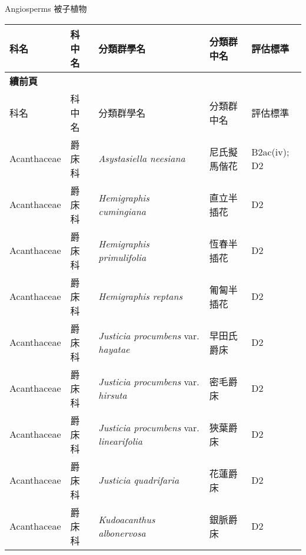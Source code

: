 \noindent\normalfont\selectfont Angiosperms 被子植物
\footnotesize\selectfont
        {\def\arraystretch{1.5}\tabcolsep=2pt
        \begin{longtable}{p{2.5cm}p{2.5cm}p{4.5cm}p{2.5cm}p{3cm}}
        \toprule
          科名 & 科中名 & 分類群學名 & 分類群中名 & 評估標準 \\
        \midrule 
        \endfirsthead

        {{\bfseries 續前頁 }} \\
        科名 & 科中名 & 分類群學名 & 分類群中名 & 評估標準 \\
        \midrule
        \endhead
                Acanthaceae & 爵床科 & \textit{Asystasiella neesiana}  & 尼氏擬馬偕花 & B2ac(iv); D2 \index{Asystasiella@\textit{Asystasiella}!neesiana@\textit{neesiana}}  \index{尼氏擬馬偕花} \\
    Acanthaceae & 爵床科 & \textit{Hemigraphis cumingiana}  & 直立半插花 & D2 \index{Hemigraphis@\textit{Hemigraphis}!cumingiana@\textit{cumingiana}}  \index{直立半插花} \\
    Acanthaceae & 爵床科 & \textit{Hemigraphis primulifolia}  & 恆春半插花 & D2 \index{Hemigraphis@\textit{Hemigraphis}!primulifolia@\textit{primulifolia}}  \index{恆春半插花} \\
    Acanthaceae & 爵床科 & \textit{Hemigraphis reptans}  & 匍匐半插花 & D2 \index{Hemigraphis@\textit{Hemigraphis}!reptans@\textit{reptans}}  \index{匍匐半插花} \\
    Acanthaceae & 爵床科 & \textit{Justicia procumbens} var. \textit{hayatae}  & 早田氏爵床 & D2 \index{Justicia@\textit{Justicia}!procumbens@\textit{procumbens}!var. hayatae@var. \textit{hayatae}}  \index{早田氏爵床} \\
    Acanthaceae & 爵床科 & \textit{Justicia procumbens} var. \textit{hirsuta}  & 密毛爵床 & D2 \index{Justicia@\textit{Justicia}!procumbens@\textit{procumbens}!var. hirsuta@var. \textit{hirsuta}}  \index{密毛爵床} \\
    Acanthaceae & 爵床科 & \textit{Justicia procumbens} var. \textit{linearifolia}  & 狹葉爵床 & D2 \index{Justicia@\textit{Justicia}!procumbens@\textit{procumbens}!var. linearifolia@var. \textit{linearifolia}}  \index{狹葉爵床} \\
    Acanthaceae & 爵床科 & \textit{Justicia quadrifaria}  & 花蓮爵床 & D2 \index{Justicia@\textit{Justicia}!quadrifaria@\textit{quadrifaria}}  \index{花蓮爵床} \\
    Acanthaceae & 爵床科 & \textit{Kudoacanthus albonervosa}  & 銀脈爵床 & D2 \index{Kudoacanthus@\textit{Kudoacanthus}!albonervosa@\textit{albonervosa}}  \index{銀脈爵床} \\

\end{longtable}}
